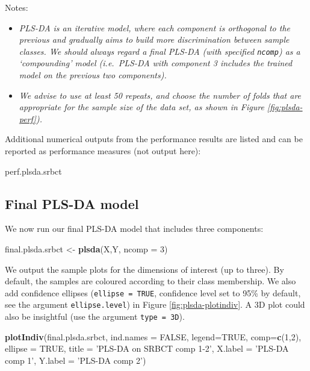 \documentclass[]{book}
\newenvironment{Shaded}{\begin{snugshade}}{\end{snugshade}}
\newcommand{\KeywordTok}[1]{\textcolor[rgb]{0.13,0.29,0.53}{\textbf{#1}}}
\newcommand{\DataTypeTok}[1]{\textcolor[rgb]{0.13,0.29,0.53}{#1}}
\newcommand{\DecValTok}[1]{\textcolor[rgb]{0.00,0.00,0.81}{#1}}
\newcommand{\StringTok}[1]{\textcolor[rgb]{0.31,0.60,0.02}{#1}}
\newcommand{\OtherTok}[1]{\textcolor[rgb]{0.56,0.35,0.01}{#1}}
\newcommand{\NormalTok}[1]{#1}
\providecommand{\tightlist}{%
  \setlength{\itemsep}{0pt}\setlength{\parskip}{0pt}}
\begin{document}
Notes:

\begin{itemize}
\tightlist
\item
  \emph{PLS-DA is an iterative model, where each component is orthogonal
  to the previous and gradually aims to build more discrimination
  between sample classes. We should always regard a final PLS-DA (with
  specified \texttt{ncomp}) as a `compounding' model (i.e.~PLS-DA with
  component 3 includes the trained model on the previous two
  components).}
\item
  \emph{We advise to use at least 50 repeats, and choose the number of
  folds that are appropriate for the sample size of the data set, as
  shown in Figure \ref{fig:plsda-perf}).}
\end{itemize}

Additional numerical outputs from the performance results are listed and
can be reported as performance measures (not output here):

\begin{Shaded}
\begin{Highlighting}[]
\NormalTok{perf.plsda.srbct}
\end{Highlighting}
\end{Shaded}

\subsection{Final PLS-DA model}\label{PLSDA:final:perf}

We now run our final PLS-DA model that includes three components:

\begin{Shaded}
\begin{Highlighting}[]
\NormalTok{final.plsda.srbct <-}\StringTok{ }\KeywordTok{plsda}\NormalTok{(X,Y, }\DataTypeTok{ncomp =} \DecValTok{3}\NormalTok{)}
\end{Highlighting}
\end{Shaded}

We output the sample plots for the dimensions of interest (up to three).
By default, the samples are coloured according to their class
membership. We also add confidence ellipses (\texttt{ellipse\ =\ TRUE},
confidence level set to 95\% by default, see the argument
\texttt{ellipse.level}) in Figure \ref{fig:plsda-plotindiv}. A 3D plot
could also be insightful (use the argument
\texttt{type\ =\ \textquotesingle{}3D\textquotesingle{}}).

\begin{Shaded}
\begin{Highlighting}[]
\KeywordTok{plotIndiv}\NormalTok{(final.plsda.srbct, }\DataTypeTok{ind.names =} \OtherTok{FALSE}\NormalTok{, }\DataTypeTok{legend=}\OtherTok{TRUE}\NormalTok{,}
          \DataTypeTok{comp=}\KeywordTok{c}\NormalTok{(}\DecValTok{1}\NormalTok{,}\DecValTok{2}\NormalTok{), }\DataTypeTok{ellipse =} \OtherTok{TRUE}\NormalTok{, }
          \DataTypeTok{title =} \StringTok{'PLS-DA on SRBCT comp 1-2'}\NormalTok{,}
          \DataTypeTok{X.label =} \StringTok{'PLS-DA comp 1'}\NormalTok{, }\DataTypeTok{Y.label =} \StringTok{'PLS-DA comp 2'}\NormalTok{)}
\end{Highlighting}
\end{Shaded}
\end{document}
